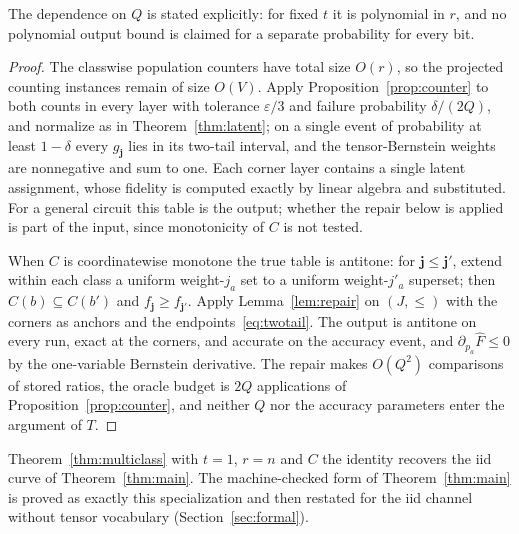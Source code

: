 \documentclass[11pt]{article}
\theoremstyle{remark}
\newcommand{\eps}{\varepsilon}
\begin{document}
The dependence on \(Q\) is stated explicitly: for fixed \(t\) it is
polynomial in \(r\), and no polynomial output bound is claimed for a
separate probability for every bit.

\begin{proof}
The classwise population counters have total size \(O(r)\), so the
projected counting instances remain of size \(O(V)\). Apply
Proposition~\ref{prop:counter} to both counts in every layer with
tolerance \(\eps/3\) and failure probability \(\delta/(2Q)\), and
normalize as in Theorem~\ref{thm:latent}; on a single event of
probability at least \(1-\delta\) every \(g_{\mathbf j}\) lies in its
two-tail interval, and the tensor-Bernstein weights are nonnegative and
sum to one. Each corner layer contains a single latent assignment, whose
fidelity is computed exactly by linear algebra and substituted. For a
general circuit this table is the output; whether the repair below is
applied is part of the input, since monotonicity of \(C\) is not tested.

When \(C\) is coordinatewise monotone the true table is antitone: for
\(\mathbf j\le\mathbf j'\), extend within each class a uniform
weight-\(j_a\) set to a uniform weight-\(j'_a\) superset; then
\(C(b)\subseteq C(b')\) and \(f_{\mathbf j}\ge f_{\mathbf j'}\). Apply
Lemma~\ref{lem:repair} on \((J,\le)\) with the corners as anchors and
the endpoints~\eqref{eq:twotail}. The output is antitone on every run,
exact at the corners, and accurate on the accuracy event, and
\(\partial_{p_a}\widehat F\le0\) by the one-variable Bernstein
derivative. The repair makes \(O(Q^2)\) comparisons of stored ratios,
the oracle budget is \(2Q\) applications of
Proposition~\ref{prop:counter}, and neither \(Q\) nor the accuracy
parameters enter the argument of \(T\).
\end{proof}

Theorem~\ref{thm:multiclass} with \(t=1\), \(r=n\) and \(C\) the identity
recovers the iid curve of Theorem~\ref{thm:main}. The machine-checked
form of Theorem~\ref{thm:main} is proved as exactly this specialization
and then restated for the iid channel without tensor vocabulary
(Section~\ref{sec:formal}).
\end{document}
